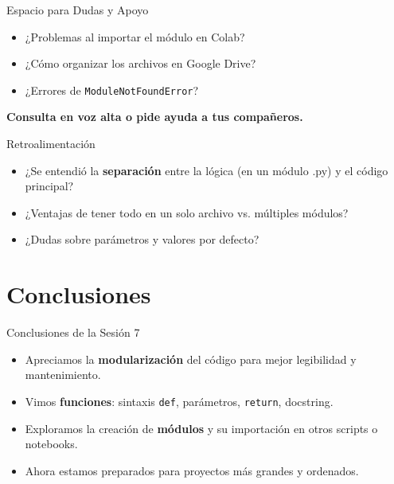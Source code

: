 \documentclass[10pt]{beamer}
\begin{document}
\begin{frame}{Espacio para Dudas y Apoyo}
  \begin{itemize}
    \item ¿Problemas al importar el módulo en Colab?
    \item ¿Cómo organizar los archivos en Google Drive?
    \item ¿Errores de \texttt{ModuleNotFoundError}?
  \end{itemize}
  \vspace{0.2cm}
  \textbf{Consulta en voz alta o pide ayuda a tus compañeros.}
\end{frame}

\begin{frame}{Retroalimentación}
  \begin{itemize}
    \item ¿Se entendió la \textbf{separación} entre la lógica (en un módulo .py) y el código principal?
    \item ¿Ventajas de tener todo en un solo archivo vs. múltiples módulos?
    \item ¿Dudas sobre parámetros y valores por defecto?
  \end{itemize}
\end{frame}

\section{Conclusiones}

\begin{frame}{Conclusiones de la Sesión 7}
  \begin{itemize}
    \item Apreciamos la \textbf{modularización} del código para mejor legibilidad y mantenimiento.
    \item Vimos \textbf{funciones}: sintaxis \texttt{def}, parámetros, \texttt{return}, docstring.
    \item Exploramos la creación de \textbf{módulos} y su importación en otros scripts o notebooks.
    \item Ahora estamos preparados para proyectos más grandes y ordenados.
  \end{itemize}
\end{frame}
\end{document}
